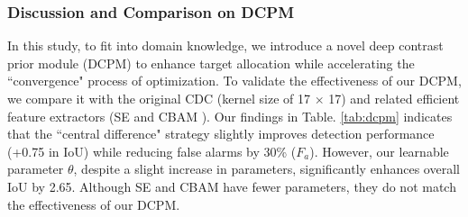 \documentclass[10pt,journal,compsoc]{IEEEtran}
\begin{document}
\subsubsection{Discussion and Comparison on DCPM}
In this study, to fit into domain knowledge, we introduce a novel deep contrast prior module (DCPM) to enhance target allocation while accelerating the “convergence" process of optimization. To validate the effectiveness of our DCPM, we compare it with the original CDC \cite{yu-2020-cdc} (kernel size of 17 $\times$ 17) and related efficient feature extractors (SE \cite{hu-2018-senet} and CBAM \cite{woo-2018-cbam}). Our findings in Table. \ref{tab:dcpm} indicates that the “central difference" strategy slightly improves detection performance (+0.75 in IoU) while reducing false alarms by 30\% ($F_a$). However, our learnable parameter $\theta$, despite a slight increase in parameters, significantly enhances overall IoU by 2.65. Although SE and CBAM have fewer parameters, they do not match the effectiveness of our DCPM.
\end{document}
